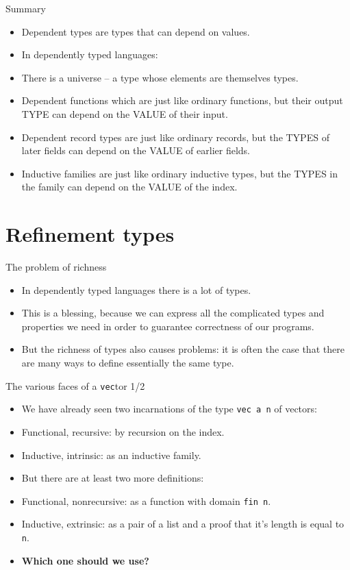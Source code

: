 \documentclass{beamer}
\newcommand{\m}[1]{\texttt{#1}}
\begin{document}
\begin{frame}{Summary}
\begin{itemize}
	\item Dependent types are types that can depend on values.
	\item In dependently typed languages:
	\item There is a universe -- a type whose elements are themselves types.
	\item Dependent functions which are just like ordinary functions, but their output TYPE can depend on the VALUE of their input.
	\item Dependent record types are just like ordinary records, but the TYPES of later fields can depend on the VALUE of earlier fields.
	\item Inductive families are just like ordinary inductive types, but the TYPES in the family can depend on the VALUE of the index.
\end{itemize}
\end{frame}

\section{Refinement types}

\begin{frame}{The problem of richness}
\begin{itemize}
    \item In dependently typed languages there is a lot of types.
    \item This is a blessing, because we can express all the complicated types and properties we need in order to guarantee correctness of our programs.
    \item But the richness of types also causes problems: it is often the case that there are many ways to define essentially the same type.
\end{itemize}
\end{frame}

\begin{frame}{The various faces of a \m{vec}tor 1/2}
\begin{itemize}
    \item We have already seen two incarnations of the type \m{vec a n} of vectors:
    \item Functional, recursive: by recursion on the index.
    \item Inductive, intrinsic: as an inductive family.
    \item But there are at least two more definitions:
    \item Functional, nonrecursive: as a function with domain \m{fin n}.
    \item Inductive, extrinsic: as a pair of a list and a proof that it's length is equal to \m{n}.
    \item \textbf{Which one should we use?}
\end{itemize}
\end{frame}
\end{document}
